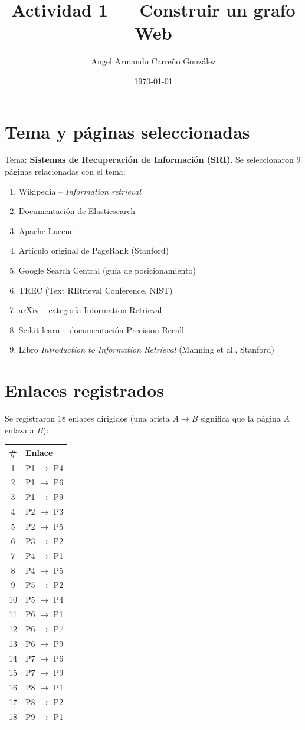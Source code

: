 \documentclass[10pt,a4paper,twocolumn]{article}
\title{Actividad 1 --- Construir un grafo Web}
\author{Angel Armando Carreño González}
\date{\today}
\begin{document}
\maketitle

\section{Tema y páginas seleccionadas}
Tema: \textbf{Sistemas de Recuperación de Información (SRI)}.
Se seleccionaron 9 páginas relacionadas con el tema:

\begin{enumerate}
  \item[P1] Wikipedia -- \textit{Information retrieval}
  \item[P2] Documentación de Elasticsearch
  \item[P3] Apache Lucene
  \item[P4] Artículo original de PageRank (Stanford)
  \item[P5] Google Search Central (guía de posicionamiento)
  \item[P6] TREC (Text REtrieval Conference, NIST)
  \item[P7] arXiv -- categoría Information Retrieval
  \item[P8] Scikit-learn -- documentación Precision-Recall
  \item[P9] Libro \textit{Introduction to Information Retrieval} (Manning et al., Stanford)
\end{enumerate}

\section{Enlaces registrados}
Se registraron 18 enlaces dirigidos (una arista $A \to B$ significa que la página $A$ enlaza a $B$):

\begin{center}
\begin{tabular}{cl}
\toprule
\# & Enlace \\
\midrule
1 & P1 $\to$ P4 \\
2 & P1 $\to$ P6 \\
3 & P1 $\to$ P9 \\
4 & P2 $\to$ P3 \\
5 & P2 $\to$ P5 \\
6 & P3 $\to$ P2 \\
7 & P4 $\to$ P1 \\
8 & P4 $\to$ P5 \\
9 & P5 $\to$ P2 \\
10 & P5 $\to$ P4 \\
11 & P6 $\to$ P1 \\
12 & P6 $\to$ P7 \\
13 & P6 $\to$ P9 \\
14 & P7 $\to$ P6 \\
15 & P7 $\to$ P9 \\
16 & P8 $\to$ P1 \\
17 & P8 $\to$ P2 \\
18 & P9 $\to$ P1 \\
\bottomrule
\end{tabular}
\end{center}
\end{document}
